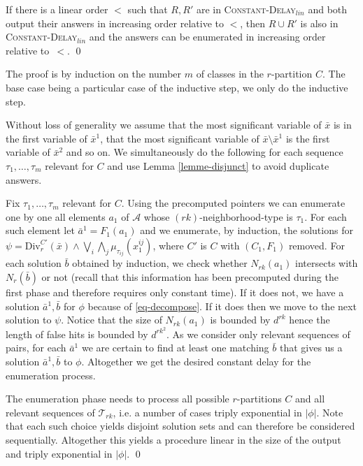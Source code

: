 \documentclass{LMCS}
\newcommand{\CDlin}{{\textsc{Constant-}\textsc{Delay}$_{lin}$}\xspace}
\newcommand\cA{\ensuremath{{\mathcal A}}\xspace}
\newcommand{\T}{\ensuremath{{\mathcal T}}}
\begin{document}
  \begin{lem}\label{lemme-disjunct}
    If there is a linear order $<$ such that $R,R'$ are in \CDlin and both
    output their answers in increasing order relative to $<$, then $R\cup R'$
    is also in \CDlin and the answers can be enumerated in increasing order
    relative to~$<$. \qed
  \end{lem}

 The proof is by induction on the number $m$ of classes in the $r$-partition
 $C$. The base case being a particular case of the inductive step, we only do
 the inductive step.

 Without loss of generality we assume that the most significant variable of
 $\bar x$ is in the first variable of $\bar x^1$, that the most significant
 variable of $\bar x \setminus \bar x^1$ is the first variable of $\bar x^2$
 and so on. We simultaneously do the following for each sequence
 $\tau_1, \ldots, \tau_m$ relevant for $C$ and use Lemma \ref{lemme-disjunct}
 to avoid duplicate answers.

 Fix $\tau_1, \ldots, \tau_m$ relevant for $C$.
 Using the precomputed pointers we can enumerate one by one all elements $a_1$
 of \cA whose $(rk)$-neighborhood-type is $\tau_1$. For each such element
 let $\bar a^1=F_1(a_1)$ and we enumerate, by induction, the solutions for
 $\psi = \text{Div}_r^{C'}(\bar x) \wedge \bigvee_{i} \bigwedge_{j} \mu_{\tau_{ij}}(x^{ij}_1)$,
 where $C'$ is $C$ with $(C_1,F_1)$ removed. For each
 solution $\bar b$ obtained by induction, we check whether $N_{rk}(a_1)$
 intersects with $N_{r}(\bar b)$ or not (recall that this information has been
 precomputed during the first phase and therefore requires only constant time).
 If it does not, we have a solution
 $\bar a^1,\bar b$ for $\phi$ because of \eqref{eq-decompose}. If it does then
 we move to the next solution to $\psi$. Notice that the size of $N_{rk}(a_1)$ is bounded
 by $d^{rk}$ hence the length of false hits is bounded by $d^{rk^2}$. As we
 consider only relevant sequences of pairs, for each $\bar a^1$ we are certain to find
 at least one matching $\bar b$ that gives us a solution $\bar a^1,\bar b$ to $\phi$.
 Altogether we get the desired constant delay for the enumeration process.

 The enumeration phase needs to process all possible $r$-partitions $C$ and all
 relevant sequences of $\T_{rk}$, i.e. a number of cases triply
 exponential in $|\phi|$. Note that each such choice yields disjoint solution
 sets and can therefore be considered sequentially. Altogether this yields a
 procedure linear in the size of the output and triply exponential in $|\phi|$. \qed
\end{document}
